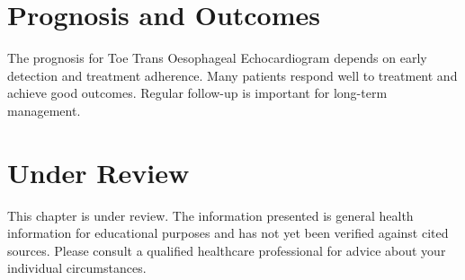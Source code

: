 \section*{Prognosis and Outcomes}
The prognosis for Toe Trans Oesophageal Echocardiogram depends on early detection and treatment adherence. Many patients respond well to treatment and achieve good outcomes. Regular follow-up is important for long-term management.
\section*{Under Review}
This chapter is under review. The information presented is general health information for educational purposes and has not yet been verified against cited sources. Please consult a qualified healthcare professional for advice about your individual circumstances.


\clearpage
